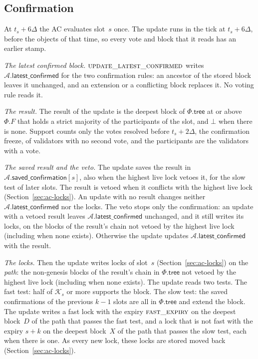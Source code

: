 \documentclass{article}
\newcommand{\committee}{\mathcal K}
\newcommand{\AC}{\mathcal A}
\newcommand{\Fr}{\Phi}
\newcommand{\tree}{\mathsf{tree}}
\newcommand{\latestConfirmed}{\mathsf{latest\_confirmed}}
\newcommand{\savedConfirmation}{\mathsf{saved\_confirmation}}
\begin{document}
\subsection{Confirmation}\label{sec:ac-confirmation}

At $t_s+6\Delta$ the AC evaluates slot~$s$ once.  The update runs in the
tick at $t_s+6\Delta$, before the objects of that time, so every vote and
block that it reads has an earlier stamp.

\emph{The latest confirmed block.}
$\Call{update\_latest\_confirmed}{}$ writes $\AC.\latestConfirmed$ for
the two confirmation rules: an ancestor of the stored block leaves it
unchanged, and an extension or a conflicting block replaces it.  No voting
rule reads it.

\emph{The result.}  The result of the update is the deepest block of
$\Fr.\tree$ at or above~$\Fr.F$ that holds a strict majority of the
participants of the slot, and $\bot$ when there is none.  Support counts
only the votes resolved before $t_s+2\Delta$, the confirmation freeze, of
validators with no second vote, and the participants are the validators
with a vote.

\emph{The saved result and the veto.}  The update saves the result in
$\AC.\savedConfirmation[s]$, also when the highest live lock vetoes it, for the slow
test of later slots.  The result is vetoed when it conflicts with the highest live lock
(Section~\ref{sec:ac-locks}).  An update with no result changes neither
$\AC.\latestConfirmed$ nor the locks.  The veto stops only the
confirmation: an update with a vetoed result leaves
$\AC.\latestConfirmed$ unchanged, and it still writes its locks, on the
blocks of the result's chain not vetoed by the highest live lock (including when none exists).  Otherwise
the update updates $\AC.\latestConfirmed$ with the result.

\emph{The locks.}  Then the update writes locks of slot~$s$
(Section~\ref{sec:ac-locks}) on the \emph{path}: the non-genesis blocks of
the result's chain in $\Fr.\tree$ not vetoed by the highest live lock (including when none exists).  The update reads
two tests.  The fast test: half of $\committee_s$ or more supports the
block.  The slow test: the saved confirmations of the previous $k-1$
slots are all in $\Fr.\tree$ and extend the block.  The update writes a
fast lock with the expiry $\Call{fast\_expiry}{}$ on the deepest
block~$D$ of the path that passes the fast test, and a lock that is not
fast with the expiry $s+k$ on the deepest block~$X$ of the path that
passes the slow test, each when there is one.  As every new lock, these
locks are stored moved back (Section~\ref{sec:ac-locks}).
\end{document}
